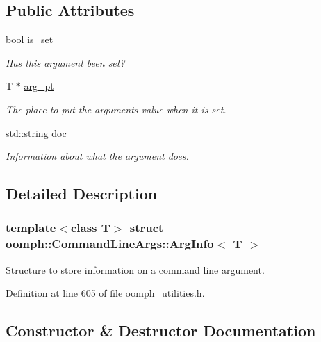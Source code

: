 \subsection*{Public Attributes}
\begin{DoxyCompactItemize}
\item 
bool \hyperlink{structoomph_1_1CommandLineArgs_1_1ArgInfo_af45e9ad65b7fa4e29eed6a1e13b5d1e9}{is\+\_\+set}
\begin{DoxyCompactList}\small\item\em Has this argument been set? \end{DoxyCompactList}\item 
T $\ast$ \hyperlink{structoomph_1_1CommandLineArgs_1_1ArgInfo_a28a76e6c1d710bffb4cc9bc0e93332fd}{arg\+\_\+pt}
\begin{DoxyCompactList}\small\item\em The place to put the argument\textquotesingle{}s value when it is set. \end{DoxyCompactList}\item 
std\+::string \hyperlink{structoomph_1_1CommandLineArgs_1_1ArgInfo_ab6bd266840a459d7171a3f532630564d}{doc}
\begin{DoxyCompactList}\small\item\em Information about what the argument does. \end{DoxyCompactList}\end{DoxyCompactItemize}


\subsection{Detailed Description}
\subsubsection*{template$<$class T$>$\newline
struct oomph\+::\+Command\+Line\+Args\+::\+Arg\+Info$<$ T $>$}

Structure to store information on a command line argument. 

Definition at line 605 of file oomph\+\_\+utilities.\+h.



\subsection{Constructor \& Destructor Documentation}
\mbox{\label{structoomph_1_1CommandLineArgs_1_1ArgInfo_ad20c82222bfd72e5139590b2832136cc}} 
